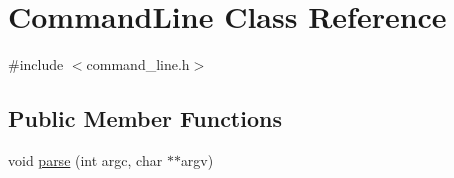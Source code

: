 \hypertarget{classCommandLine}{}\section{Command\+Line Class Reference}
\label{classCommandLine}


{\ttfamily \#include $<$command\+\_\+line.\+h$>$}

\subsection*{Public Member Functions}
\begin{DoxyCompactItemize}
\item 
void \hyperlink{classCommandLine_ac9bd8b583be689d970032d8ce975b523}{parse} (int argc, char $\ast$$\ast$argv)
\end{DoxyCompactItemize}
